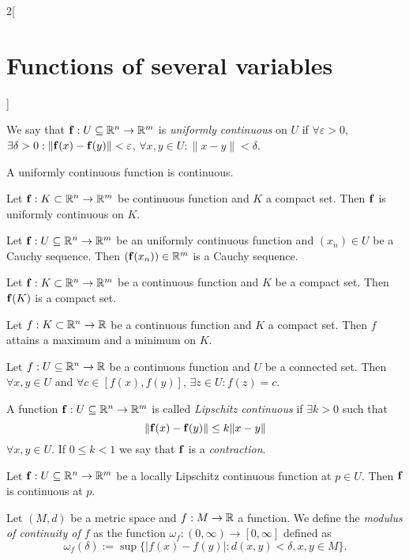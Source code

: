 \documentclass[../../../main.tex]{subfiles}
\begin{document}
\begin{multicols}{2}[\section{Functions of several variables}]
    \begin{definition}
        We say that $\mathbf{\vb{f}}:U\subseteq\mathbb{R}^n\rightarrow\mathbb{R}^m$ is \textit{uniformly continuous} on $U$ if $\forall\varepsilon>0$, $\exists\delta>0:\|\mathbf{\vb{f}}(x)-\mathbf{\vb{f}}(y)\|<\varepsilon$, $\forall x,y\in U:\|x-y\|<\delta$.
    \end{definition}
    \begin{corollary}
        A uniformly continuous function is continuous.
    \end{corollary}
    \begin{theorem}
        Let $\mathbf{\vb{f}}:K\subset\mathbb{R}^n\rightarrow\mathbb{R}^m$ be continuous function and $K$ a compact set. Then $\mathbf{\vb{f}}$ is uniformly continuous on $K$.
    \end{theorem}
    \begin{theorem}
        Let $\mathbf{\vb{f}}:U\subseteq\mathbb{R}^n\rightarrow\mathbb{R}^m$ be an uniformly continuous function and $(x_n)\in U$ be a Cauchy sequence. Then $(\mathbf{\vb{f}}(x_n))\in\mathbb{R}^m$ is a Cauchy sequence.
    \end{theorem}
    \begin{theorem}
        Let $\mathbf{\vb{f}}:K\subset\mathbb{R}^n\rightarrow\mathbb{R}^m$ be a continuous function and $K$ be a compact set. Then $\mathbf{\vb{f}}(K)$ is a compact set.
    \end{theorem}
    \begin{theorem}
        Let $f:K\subset\mathbb{R}^n\rightarrow\mathbb{R} $ be a continuous function and $K$ a compact set. Then $f$ attains a maximum and a minimum on $K$.
    \end{theorem}
    \begin{theorem}
        Let $f:U\subseteq\mathbb{R}^n\rightarrow\mathbb{R} $ be a continuous function and $U$ be a connected set. Then $\forall x,y\in U$ and $\forall c\in[f(x),f(y)]$, $\exists z\in U:f(z)=c$.
    \end{theorem}
    \begin{definition}
        A function $\mathbf{\vb{f}}:U\subseteq\mathbb{R}^n\rightarrow\mathbb{R}^m$ is called \textit{Lipschitz continuous} if $\exists k>0$ such that $$\|\mathbf{\vb{f}}(x)-\mathbf{\vb{f}}(y)\|\leq k\|x-y\|$$ $\forall x,y\in U$. If $0\leq k<1$ we say that $\mathbf{\vb{f}}$ is a \textit{contraction}.
        \label{FOSV_contr}
    \end{definition}
    \begin{prop}
        Let $\mathbf{\vb{f}}:U\subseteq\mathbb{R}^n\rightarrow\mathbb{R}^m$ be a locally Lipschitz continuous function at $p\in U$. Then $\mathbf{\vb{f}}$ is continuous at $p$.
    \end{prop}
    \begin{definition}
        Let $(M,d)$ be a metric space and $f:M\rightarrow\mathbb{R} $ a function. We define the \textit{modulus of continuity of $f$} as the function $\omega_f:(0,\infty)\rightarrow[0,\infty]$ defined as $$\omega_f(\delta):=\sup\{|f(x)-f(y)|:d(x,y)<\delta, x,y\in M\}.$$
    \end{definition}

\end{multicols}
\end{document}
